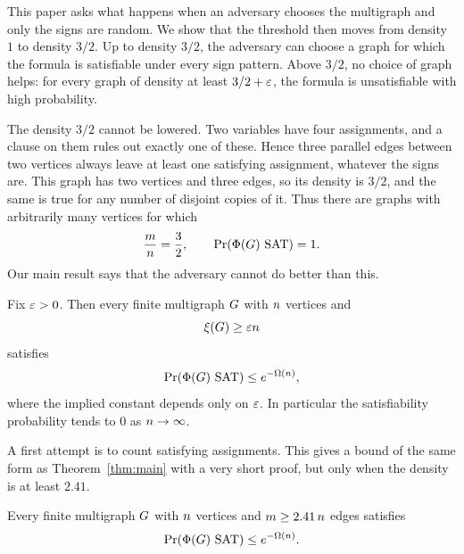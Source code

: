 This paper asks what happens when an adversary chooses the multigraph and only
the signs are random. We show that the threshold then moves from density \(1\)
to density \(3/2\). Up to density \(3/2\), the adversary can choose a graph for
which the formula is satisfiable under every sign pattern. Above \(3/2\), no
choice of graph helps: for every graph of density at least \(3/2+\varepsilon\), the
formula is unsatisfiable with high probability.

The density \(3/2\) cannot be lowered. Two variables have four assignments, and
a clause on them rules out exactly one of these. Hence three parallel edges
between two vertices always leave at least one satisfying assignment, whatever
the signs are. This graph has two vertices and three edges, so its density is
\(3/2\), and the same is true for any number of disjoint copies of it. Thus
there are graphs with arbitrarily many vertices for which
\[
  \frac{\medge}{\nvert}=\frac32,
  \qquad
  \Prx{\rform{\Gin}\SAT}=1 .
\]
Our main result says that the adversary cannot do better than this.

\begin{theorem}\label{thm:overview-main}\label{thm:main}
Fix \(\varepsilon>0\). Then every finite multigraph \(G\) with \(n\)
vertices and
\[
  \xi(G)\ge\varepsilon n
\]
satisfies
\[
  \Prx{\rform{\Gin}\SAT}\le e^{-\Omega(\nvert)},
\]
where the implied constant depends only on \(\varepsilon\). In particular the
satisfiability probability tends to \(0\) as \(n\to\infty\).
\end{theorem}

A first attempt is to count satisfying assignments. This gives a bound of the
same form as Theorem~\ref{thm:main} with a very short proof, but only when the
density is at least \(2.41\).

\begin{lemma}\label{lem:overview-first-moment}
Every finite multigraph \(G\) with \(n\) vertices and
\(m\ge2.41\,n\) edges satisfies
\[
  \Prx{\rform{\Gin}\SAT}\le e^{-\Omega(\nvert)} .
\]
\end{lemma}

